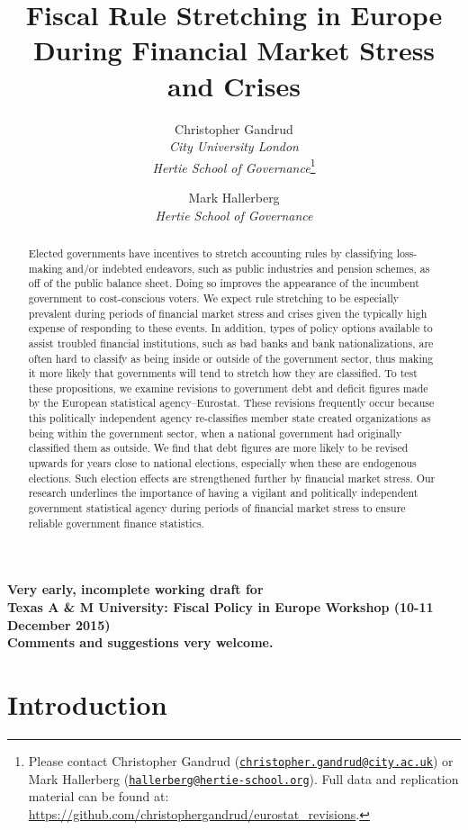 \documentclass[]{article}
\title{Fiscal Rule Stretching in Europe During Financial Market Stress and Crises}
\author{Christopher Gandrud \\ \emph{City University London} \\ \emph{Hertie School of Governance}\footnote{Please contact Christopher Gandrud
(\href{mailto:christopher.gandrud@city.ac.uk}{\nolinkurl{christopher.gandrud@city.ac.uk}}) or Mark Hallerberg (\href{mailto:hallerberg@hertie-school.org}{\nolinkurl{hallerberg@hertie-school.org}}). Full data and replication material can be found at: \url{https://github.com/christophergandrud/eurostat_revisions}.}
\and
Mark Hallerberg \\ \emph{Hertie School of Governance}}
\begin{document}
\maketitle


\begin{center}
    \textbf{Very early, incomplete working draft for\\ Texas A \& M University: Fiscal Policy in Europe Workshop (10-11 December 2015) \\
    Comments and suggestions very welcome.}
\end{center}

\begin{abstract}
    Elected governments have incentives to stretch accounting rules by classifying loss-making and/or indebted endeavors, such as public industries and pension schemes, as off of the public balance sheet. Doing so improves the appearance of the incumbent government to cost-conscious voters. We expect rule stretching to be especially prevalent during periods of financial market stress and crises given the typically high expense of responding to these events. In addition, types of policy options available to assist troubled financial institutions, such as bad banks and bank nationalizations, are often hard to classify as being inside or outside of the government sector, thus making it more likely that governments will tend to stretch how they are classified. To test these propositions, we examine revisions to government debt and deficit figures made by the European statistical agency--Eurostat. These revisions frequently occur because this politically independent agency re-classifies member state created organizations as being within the government sector, when a national government had originally classified them as outside. We find that debt figures are more likely to be revised upwards for years close to national elections, especially when these are endogenous elections. Such election effects are strengthened further by financial market stress. Our research underlines the importance of having a vigilant and politically independent government statistical agency during periods of financial market stress to ensure reliable government finance statistics.
\end{abstract}

\section{Introduction}
\end{document}
